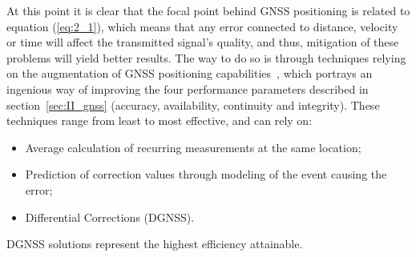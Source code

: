 At this point it is clear that the focal point behind GNSS positioning is related to equation (\ref{eq:2_1}), which means that any error connected to distance, velocity or time will affect the transmitted signal's quality, and thus, mitigation of these problems will yield better results.
The way to do so is through techniques relying on the augmentation of GNSS positioning capabilities~\cite{novatel_gnss,kaplan_2017}, which portrays an ingenious way of improving the four performance parameters described in section~\ref{sec:II_gnss} (accuracy, availability, continuity and integrity).
These techniques range from least to most effective, and can rely on:

\begin{itemize}
    \item Average calculation of recurring measurements at the same location;
    \item Prediction of correction values through modeling of the event causing the error;
    \item Differential Corrections (DGNSS).
\end{itemize}
DGNSS solutions represent the highest efficiency attainable. %





